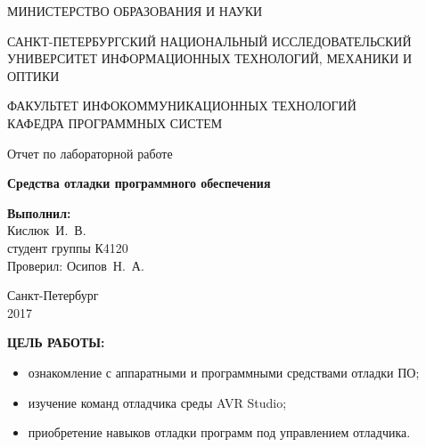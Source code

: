 \documentclass[14pt,a4paper]{extreport}
\newcommand{\header}[1]{%
{
\clearpage%
\fontsize{16pt}{14pt}\selectfont
\begin{center}
\textbf{\MakeUppercase{#1}:}
\end{center}
}
}
\newcommand{\labyear}{2017}
\newcommand{\labtitle}{Средства отладки программного обеспечения}
\newcommand{\prepod}{Осипов~Н.~А.}
\newcommand{\student}{Кислюк~И.~В.}
\begin{document}
	\begin{titlepage}
	\begin{center}	
		\fontsize{14pt}{14pt}\selectfont
		МИНИСТЕРСТВО ОБРАЗОВАНИЯ И НАУКИ\\

		\vspace*{0.6\baselineskip}

		\MakeUppercase{Санкт-Петербургский Национальный Исследовательский Университет Информационных технологий, механики и оптики}		
		
		\vspace*{0.6\baselineskip}
		\MakeUppercase{Факультет Инфокоммуникационных технологий}\\
		\MakeUppercase{Кафедра программных систем}
	
		\vspace*{7\baselineskip}
		\fontsize{19pt}{18pt}\selectfont
		Отчет по лабораторной работе
		
		\fontsize{20pt}{18pt}\selectfont
		\textbf{\labtitle}\\
		\vspace*{1.15\baselineskip}
		\end{center}
	
	\vspace*{2\baselineskip}
	\begin{flushright}
	\fontsize{14pt}{14pt}\selectfont
	\textbf{Выполнил:}\\
	\student\\
	студент группы К4120\\
	Проверил: \prepod\\
	\end{flushright}
	
	\vspace{\fill}
	\begin{center}
	Санкт-Петербург\\
	\vspace{-1ex}
	\labyear
	\end{center}
	
\end{titlepage}

\fontsize{14pt}{14pt}\selectfont

\header{Цель работы}


\begin{itemize}

\item ознакомление с аппаратными и программными средствами отладки ПО;
\item изучение команд отладчика среды AVR Studio;
\item приобретение навыков отладки программ под управлением отладчика.

\end{itemize}
\end{document}

